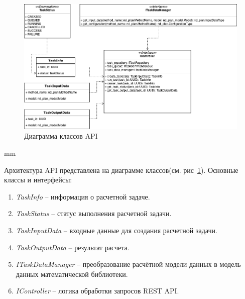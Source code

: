 \begin{figure}[H]
	\includegraphics[width=\textwidth]{architecture/pictures/executor/api_classes_diagram}
	\caption{Диаграмма классов API}
	\label{pic:architecture__api-classes-diagram}
\end{figure}
 mm

Архитектура API представлена на диаграмме классов(см. рис\ \ref{pic:architecture__api-classes-diagram}).
Основные классы и интерфейсы:
\begin{enumerate}
	\item \textit{TaskInfo} -- информация о расчетной задаче.
	\item \textit{TaskStatus} -- статус выполнения расчетной задачи.
	\item \textit{TaskInputData} -- входные данные для создания расчетной задачи.
	\item \textit{TaskOutputData} -- результат расчета.
	\item \textit{ITaskDataManager} -- преобразование расчётной модели данных в модель данных математической библиотеки.
	\item \textit{IController} -- логика обработки запросов REST API.
\end{enumerate}